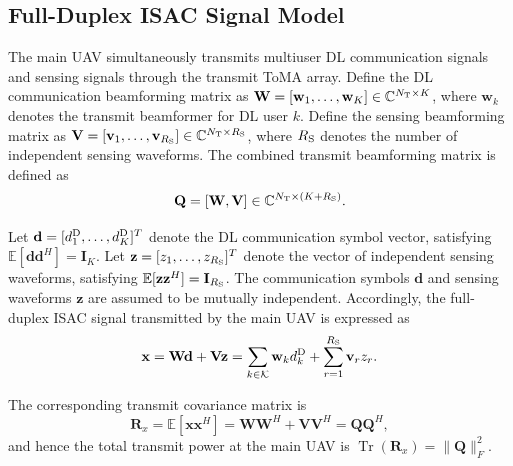 \documentclass[letterpaper,journal]{IEEEtran}
\begin{document}
\subsection{Full-Duplex ISAC Signal Model}
\label{subsec:signal_model}

The main UAV simultaneously transmits multiuser DL communication signals and sensing signals through the transmit ToMA array. Define the DL communication beamforming matrix as $\mathbf W=[\mathbf w_1,\ldots,\mathbf w_K]\in\mathbb C^{N_{\rm T}\times K}$, where $\mathbf w_k$ denotes the transmit beamformer for DL user $k$. Define the sensing beamforming matrix as $\mathbf V=[\mathbf v_1,\ldots,\mathbf v_{R_{\rm S}}]\in\mathbb C^{N_{\rm T}\times R_{\rm S}}$, where $R_{\rm S}$ denotes the number of independent sensing waveforms. The combined transmit beamforming matrix is defined as
\begin{equation}
\mathbf Q
=
[\mathbf W,\mathbf V]
\in
\mathbb C^{N_{\rm T}\times(K+R_{\rm S})}.
\label{eq:combined_beamforming}
\end{equation}

Let $\mathbf d=[d_1^{\rm D},\ldots,d_K^{\rm D}]^T$ denote the DL communication symbol vector, satisfying $\mathbb E[\mathbf d\mathbf d^H]=\mathbf I_K$. Let $\mathbf z=[z_1,\ldots,z_{R_{\rm S}}]^T$ denote the vector of independent sensing waveforms, satisfying $\mathbb E[\mathbf z\mathbf z^H]=\mathbf I_{R_{\rm S}}$. The communication symbols $\mathbf d$ and sensing waveforms $\mathbf z$ are assumed to be mutually independent. Accordingly, the full-duplex ISAC signal transmitted by the main UAV is expressed as
\begin{equation}
\mathbf x
=
\mathbf W\mathbf d+\mathbf V\mathbf z
=
\sum_{k\in\mathcal K}\mathbf w_kd_k^{\rm D}
+
\sum_{r=1}^{R_{\rm S}}\mathbf v_rz_r.
\label{eq:transmit_signal}
\end{equation}

The corresponding transmit covariance matrix is
\begin{equation}
\mathbf R_x
=
\mathbb E[\mathbf x\mathbf x^H]
=
\mathbf W\mathbf W^H
+
\mathbf V\mathbf V^H
=
\mathbf Q\mathbf Q^H,
\label{eq:tx_covariance}
\end{equation}
and hence the total transmit power at the main UAV is $\operatorname{Tr}(\mathbf R_x)=\|\mathbf Q\|_F^2$.
\end{document}
